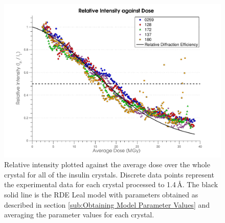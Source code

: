 \begin{figure}
    \centering
    \includegraphics[width=1\textwidth]{figures/dwd/relintall_14A.pdf}
    \caption{Relative intensity plotted against the average dose over the whole crystal for all of the insulin crystals. Discrete data points represent the experimental data for each crystal processed to 1.4\,\AA. The black solid line is the RDE Leal model with parameters obtained as described in section \ref{sub:Obtaining Model Parameter Values} and averaging the parameter values for each crystal.}
    \label{fig:Relative Intensity - All crystals 1.4 Angstroms}
\end{figure}
